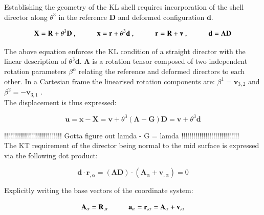 Establishing the geometry of the KL shell requires incorporation of the shell director along $\theta^3$ in the reference $\mathbf{D}$ and deformed configuration $\mathbf{d}$.

\begin{equation} 
\mathbf{X} = \mathbf{R} + \theta^3 \mathbf{D}\ ,
\hspace{10mm}
\mathbf{x} = \mathbf{r} + \theta^3 \mathbf{d}\ ,
\hspace{10mm}
\mathbf{r} = \mathbf{R} + \mathbf{v}\ ,
\hspace{10mm}
\mathbf{d} = \boldsymbol{\Lambda}  \mathbf{D}
\label{eqskt1}
\end{equation}

The above equation enforces the KL condition of a straight director with the linear description of $\theta^3 \mathbf{d}$. $\boldsymbol{\Lambda}$ is a rotation tensor composed of two independent rotation parameters $\beta^\alpha$ relating the reference and deformed directors to each other. In a Cartesian frame the linearised rotation components are: $\beta^1 = \mathbf{v}_{3,2}$ and $\beta^2 = -\mathbf{v}_{3,1}$ \cite{BischLitBook04}.  \\

The displacement is thus expressed:

\begin{equation} 
\mathbf{u} = \mathbf{x} - \mathbf{X}
=
\mathbf{v} + \theta^3 (\boldsymbol{\Lambda} - \mathbf{G}) \mathbf{D}
=
\mathbf{v} + \theta^3 \mathbf{d}
\label{eqskt2}
\end{equation}

!!!!!!!!!!!!!!!!!!!!!!!!!!!!!
Gotta figure out lamda - G = lamda
!!!!!!!!!!!!!!!!!!!!!!!!!!!!! \\

The KT requirement of the director being normal to the mid surface is expressed via the following dot product:

\begin{equation} 
\mathbf{d} \cdot \mathbf{r}_{,\alpha}
=
(\boldsymbol{\Lambda} \mathbf{D}) \cdot (\mathbf{A}_\alpha + \mathbf{v}_{,\alpha})
=
0
\label{eqskt3}
\end{equation}

Explicitly writing the base vectors of the coordinate system:

\begin{equation} 
\mathbf{A}_\alpha  = \mathbf{R}_{,\alpha}
\hspace{10mm}
\mathbf{a}_\alpha  = \mathbf{r}_{,\alpha} = \mathbf{A}_\alpha + \mathbf{v}_{,\alpha}
\label{eqskt4}
\end{equation}

